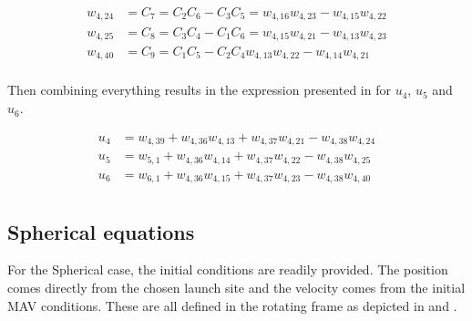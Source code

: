 \begin{equation} \label{eq:kHatAuxF}
\begin{split}
w_{4,24} &= C_{7} = C_{2}C_{6}-C_{3}C_{5} = w_{4,16}w_{4,23}-w_{4,15}w_{4,22} \\
w_{4,25} &= C_{8} = C_{3}C_{4}-C_{1}C_{6} =w_{4,15}w_{4,21}-w_{4,13}w_{4,23}\\
w_{4,40} &= C_{9} = C_{1}C_{5}-C_{2}C_{4} w_{4,13}w_{4,22}-w_{4,14}w_{4,21}\\
\end{split}
\end{equation}

Then combining everything results in the expression presented in  for $u_{4}$, $u_{5}$ and $u_{6}$.

\begin{equation} \label{eq:finalAccAuxF}
\begin{split}
u_{4} &= w_{4,39}+w_{4,36}w_{4,13}+w_{4,37}w_{4,21}-w_{4,38}w_{4,24} \\
u_{5} &= w_{5,1}+w_{4,36}w_{4,14}+w_{4,37}w_{4,22}-w_{4,38}w_{4,25} \\
u_{6} &= w_{6,1}+w_{4,36}w_{4,15}+w_{4,37}w_{4,23}-w_{4,38}w_{4,40} \\
\end{split}
\end{equation}
















\subsection{Spherical equations}
\label{subsec:sphereq}
For the Spherical case, the initial conditions are readily provided. The position comes directly from the chosen launch site and the velocity comes from the initial \ac{MAV} conditions. These are all defined in the rotating frame as depicted in  and .

